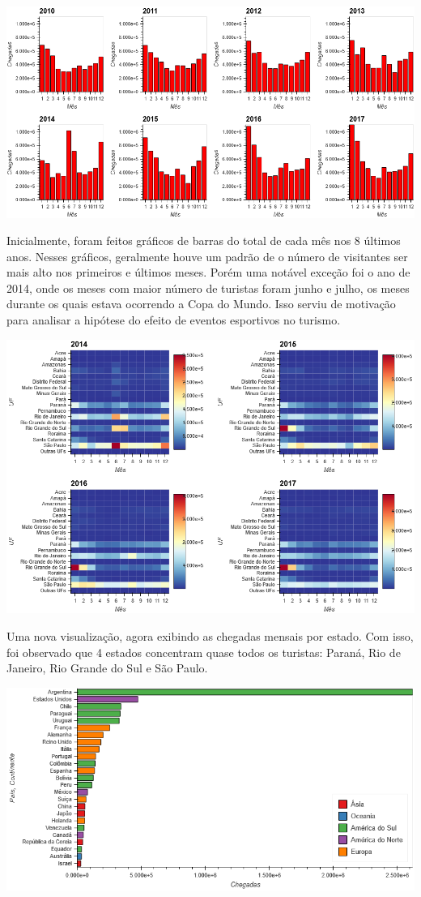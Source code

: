 \documentclass[review]{elsarticle}
\begin{document}
\includegraphics[width=\textwidth]{Bars-Year}

Inicialmente, foram feitos gráficos de barras do total de cada mês nos 8 últimos anos. Nesses gráficos, geralmente houve um padrão de o número de visitantes ser mais alto nos primeiros e últimos meses. Porém uma notável exceção foi o ano de 2014, onde os meses com maior número de turistas foram junho e julho, os meses durante os quais estava ocorrendo a Copa do Mundo. Isso serviu de motivação para analisar a hipótese do efeito de eventos esportivos no turismo.

\includegraphics[width=\textwidth]{Heatmap-Year-UF}

Uma nova visualização, agora exibindo as chegadas mensais por estado. Com isso, foi observado que 4 estados concentram quase todos os turistas: Paraná, Rio de Janeiro, Rio Grande do Sul e São Paulo.

\includegraphics[width=\textwidth]{Bars-Country}
\end{document}
